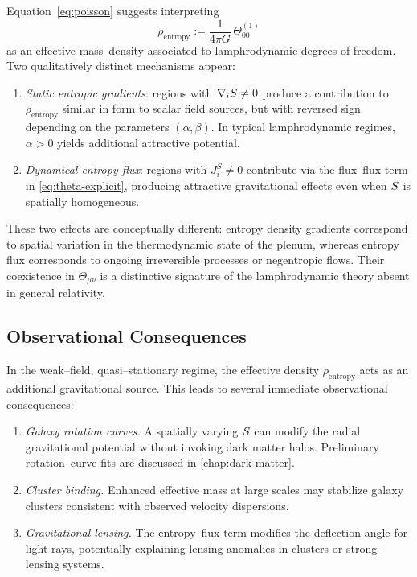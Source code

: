 Equation~\eqref{eq:poisson} suggests interpreting
\[
  \rho_{\mathrm{entropy}}
   := \frac{1}{4\pi G}\,\Theta^{(1)}_{00}
\]
as an effective mass--density associated to lamphrodynamic degrees of freedom.
Two qualitatively distinct mechanisms appear:

\begin{enumerate}
\item \emph{Static entropic gradients}: regions with $\nabla_iS\neq0$
produce a contribution to $\rho_{\mathrm{entropy}}$ similar in form to scalar
field sources, but with reversed sign depending on the parameters
$(\alpha,\beta)$. In typical lamphrodynamic regimes, $\alpha > 0$ yields
additional attractive potential.

\item \emph{Dynamical entropy flux}: regions with $J^S_i\neq0$
contribute via the flux--flux term in \eqref{eq:theta-explicit}, producing
attractive gravitational effects even when $S$ is spatially
homogeneous.
\end{enumerate}

These two effects are conceptually different: entropy density gradients
correspond to spatial variation in the thermodynamic state of the plenum,
whereas entropy flux corresponds to ongoing irreversible processes or
negentropic flows. Their coexistence in $\Theta_{\mu\nu}$ is a distinctive
signature of the lamphrodynamic theory absent in general relativity.

\subsection{Observational Consequences}

In the weak--field, quasi--stationary regime, the effective density
$\rho_{\mathrm{entropy}}$ acts as an additional gravitational source.
This leads to several immediate observational consequences:

\begin{enumerate}
\item \emph{Galaxy rotation curves.} A spatially varying $S$ can modify
the radial gravitational potential without invoking dark matter halos.
Preliminary rotation--curve fits are discussed in \cref{chap:dark-matter}.

\item \emph{Cluster binding.} Enhanced effective mass at large scales may
stabilize galaxy clusters consistent with observed velocity dispersions.

\item \emph{Gravitational lensing.} The entropy--flux term modifies the
deflection angle for light rays, potentially explaining lensing anomalies in
clusters or strong--lensing systems.
\end{enumerate}

